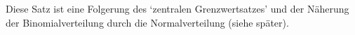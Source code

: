 Diese Satz ist eine Folgerung des `zentralen Grenzwertsatzes' und der Näherung der Binomialverteilung durch die Normalverteilung (siehe später).






